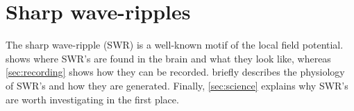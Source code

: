 \chapter{Sharp wave-ripples}
\label{ch:SWR}

The sharp wave-ripple (SWR) is a well-known motif of the local field potential.  shows where SWR's are found in the brain and what they look like, whereas \cref{sec:recording} shows how they can be recorded.  briefly describes the physiology of SWR's and how they are generated. Finally, \cref{sec:science} explains why SWR's are worth investigating in the first place.





